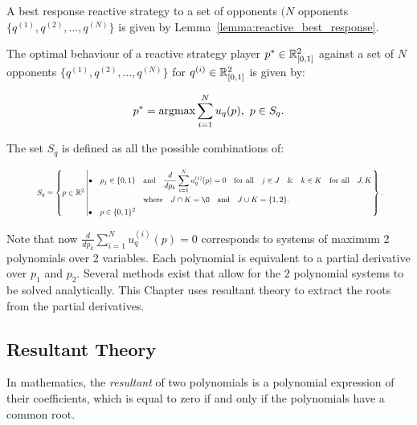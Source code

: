 A best response reactive strategy to a set of opponents \((N\) opponents
\(\{q^{(1)}, q^{(2)}, \dots, q^{(N)} \}\) is given by
Lemma~\ref{lemma:reactive_best_response}.

\begin{lemma}\label{lemma:reactive_best_response}
    The optimal behaviour of a reactive strategy player
    \(p^* \in \mathbb{R}_{[0, 1]} ^ 2\)
    against a set of \(N\) opponents \(\{q^{(1)}, q^{(2)}, \dots, q^{(N)} \}\)
    for \(q^{(i)} \in \mathbb{R}_{[0, 1]} ^ 2\) is given by:

    \[p^* = \textnormal{argmax}\sum\limits_{i=1} ^ N  u_q(p), \ p \in S_q.\]

    The set \(S_q\) is defined as all the possible combinations of:
    
    \begin{equation}\label{eq:s_q_reactive_set}
        \resizebox{.9\linewidth}{!}{ $
        S_q =
        \left\{p \in \mathbb{R} ^ 2 \left|
            \begin{aligned}
                \bullet\quad p_j \in \{0, 1\} & \quad \text{and} \quad \frac{d}{dp_k} 
                \sum\limits_{i=1} ^ N  u_q^{(i)}(p) = 0
                \quad \text{for all} \quad j \in J \quad \&  \quad k \in K  \quad \text{for all} \quad J, K \\
                & \quad \text{where} \quad J \cap K = \O \quad
                \text{and} \quad J \cup K = \{1, 2\}.\\
                \bullet\quad  p \in \{0, 1\} ^ 2
            \end{aligned}\right.
        \right\}.
        $}
    \end{equation}
\end{lemma}

Note that now \(\frac{d}{dp_k} \sum\limits_{i=1} ^ N  u_q^{(i)}(p) = 0\)
corresponds to systems of maximum 2 polynomials over 2 variables. Each polynomial
is equivalent to a partial derivative over \(p_1\) and \(p_2\). Several methods
exist that allow for the \(2\) polynomial systems to be solved analytically.
This Chapter uses resultant theory to extract the roots from the partial
derivatives.

\subsection{Resultant Theory}

In mathematics, the \textit{resultant} of two polynomials is a polynomial expression of
their coefficients, which is equal to zero if and only if the polynomials have a
common root. 

